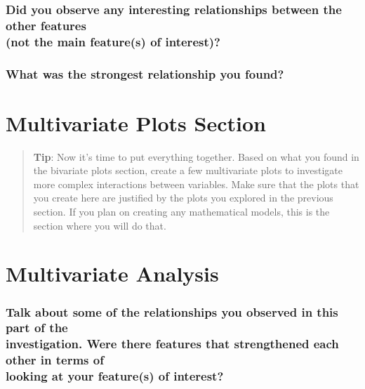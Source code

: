 \documentclass[]{article}
\begin{document}
\subsubsection{\texorpdfstring{Did you observe any interesting
relationships between the other features\\
(not the main feature(s) of
interest)?}{Did you observe any interesting relationships between the other features (not the main feature(s) of interest)?}}\label{did-you-observe-any-interesting-relationships-between-the-other-features-not-the-main-features-of-interest}

\subsubsection{What was the strongest relationship you
found?}\label{what-was-the-strongest-relationship-you-found}

\section{Multivariate Plots Section}\label{multivariate-plots-section}

\begin{quote}
\textbf{Tip}: Now it's time to put everything together. Based on what
you found in the bivariate plots section, create a few multivariate
plots to investigate more complex interactions between variables. Make
sure that the plots that you create here are justified by the plots you
explored in the previous section. If you plan on creating any
mathematical models, this is the section where you will do that.
\end{quote}

\section{Multivariate Analysis}\label{multivariate-analysis}

\subsubsection{\texorpdfstring{Talk about some of the relationships you
observed in this part of the\\
investigation. Were there features that strengthened each other in terms
of\\
looking at your feature(s) of
interest?}{Talk about some of the relationships you observed in this part of the investigation. Were there features that strengthened each other in terms of looking at your feature(s) of interest?}}\label{talk-about-some-of-the-relationships-you-observed-in-this-part-of-the-investigation.-were-there-features-that-strengthened-each-other-in-terms-of-looking-at-your-features-of-interest}
\end{document}
